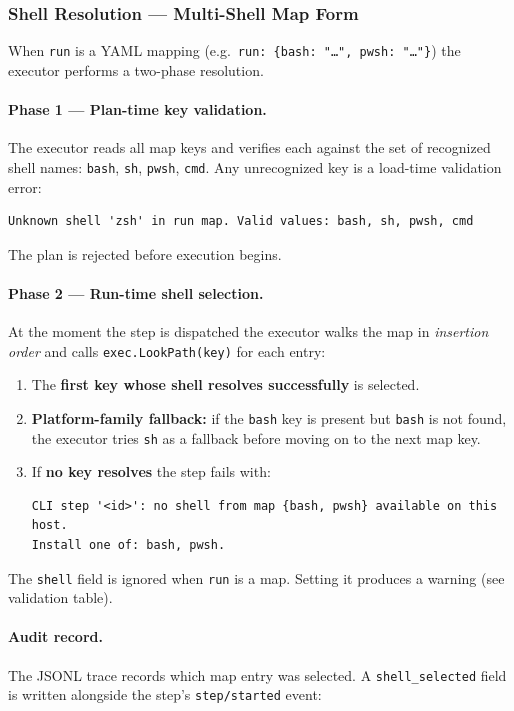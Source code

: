 \subsubsection*{Shell Resolution — Multi-Shell Map Form}

When \texttt{run} is a YAML mapping (e.g.\
\texttt{run: \{bash: "…", pwsh: "…"\}}) the executor performs a two-phase
resolution.

\paragraph{Phase 1 — Plan-time key validation.}
The executor reads all map keys and verifies each against the set of recognized
shell names: \texttt{bash}, \texttt{sh}, \texttt{pwsh}, \texttt{cmd}.  Any
unrecognized key is a load-time validation error:

\begin{verbatim}
Unknown shell 'zsh' in run map. Valid values: bash, sh, pwsh, cmd
\end{verbatim}

The plan is rejected before execution begins.

\paragraph{Phase 2 — Run-time shell selection.}
At the moment the step is dispatched the executor walks the map in \emph{insertion
order} and calls \texttt{exec.LookPath(key)} for each entry:

\begin{enumerate}
  \item The \textbf{first key whose shell resolves successfully} is selected.
  \item \textbf{Platform-family fallback:} if the \texttt{bash} key is present but
        \texttt{bash} is not found, the executor tries \texttt{sh} as a fallback
        before moving on to the next map key.
  \item If \textbf{no key resolves} the step fails with:
\begin{verbatim}
CLI step '<id>': no shell from map {bash, pwsh} available on this host.
Install one of: bash, pwsh.
\end{verbatim}
\end{enumerate}

The \texttt{shell} field is ignored when \texttt{run} is a map.  Setting it
produces a warning (see validation table).

\paragraph{Audit record.}
The JSONL trace records which map entry was selected.  A \texttt{shell\_selected}
field is written alongside the step's \texttt{step/started} event:

